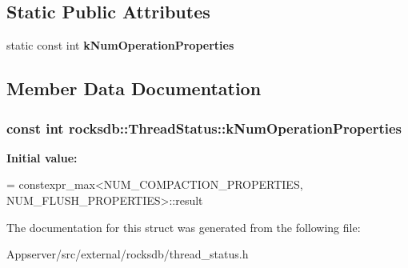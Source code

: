 \subsection*{Static Public Attributes}
\begin{DoxyCompactItemize}
\item 
static const int {\bfseries k\+Num\+Operation\+Properties}
\end{DoxyCompactItemize}


\subsection{Member Data Documentation}
\subsubsection[{\texorpdfstring{k\+Num\+Operation\+Properties}{kNumOperationProperties}}]{\setlength{\rightskip}{0pt plus 5cm}const int rocksdb\+::\+Thread\+Status\+::k\+Num\+Operation\+Properties\hspace{0.3cm}{\ttfamily [static]}}\hypertarget{structrocksdb_1_1ThreadStatus_a64981a477e53c886cf73c7b851e29333}{}\label{structrocksdb_1_1ThreadStatus_a64981a477e53c886cf73c7b851e29333}
{\bfseries Initial value\+:}
\begin{DoxyCode}
=
      constexpr\_max<NUM\_COMPACTION\_PROPERTIES, NUM\_FLUSH\_PROPERTIES>::result
\end{DoxyCode}


The documentation for this struct was generated from the following file\+:\begin{DoxyCompactItemize}
\item 
Appserver/src/external/rocksdb/thread\+\_\+status.\+h\end{DoxyCompactItemize}
